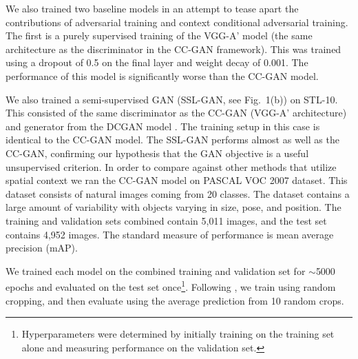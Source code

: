 \documentclass{article} %
\begin{document}
We also trained two baseline models in an attempt to tease apart the
contributions of adversarial training and context conditional
adversarial training.  The first is a purely supervised training of
the VGG-A' model (the same architecture as the discriminator in the
CC-GAN framework). This was trained using a dropout of 0.5 on the
final layer and weight decay of 0.001.  The performance of this model is significantly worse than the CC-GAN model.

We also trained a semi-supervised GAN (SSL-GAN, see Fig.~1(b)) on STL-10. This
consisted of the same discriminator as the CC-GAN (VGG-A'
architecture) and generator from the DCGAN model
\citep{radford2016}. The training setup in this case is identical to
the CC-GAN model. The SSL-GAN performs almost as well as the CC-GAN,
confirming our hypothesis that the GAN objective is a useful unsupervised criterion.
In order to compare against other methods that utilize spatial context
we ran the CC-GAN model on PASCAL VOC 2007 dataset.  This dataset
consists of natural images coming from 20 classes.  The dataset
contains a large amount of variability with objects varying in size,
pose, and position.  The training and validation sets combined
contain 5,011 images, and the test set contains 4,952 images. The
standard measure of performance is mean average precision (mAP).

We trained each model on the combined training and validation set for
$\sim$5000 epochs and evaluated on the test set
once\footnote{Hyperparameters were determined by initially training on
  the training set alone and measuring performance on the validation
  set.}. Following \cite{pathak2016}, we train using
random cropping, and then evaluate using the average prediction from
10 random crops.
\end{document}
